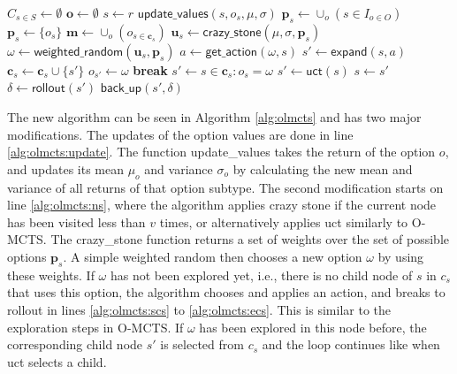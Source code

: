 \begin{algorithm}[h]
	\caption{$\mathsf{OL-MCTS}(O, r, t, d, v, \mu, \sigma)$}
	\label{alg:olmcts}
	\begin{algorithmic}[1]
		\State $C_{s \in S} \gets \emptyset$
		\State $\mathbf{o} \gets \emptyset$
		 \label{alg:olmcts:mainloop}
			\State $s \gets r$
			 \label{alg:olmcts:innerloop}
				 \label{alg:olmcts:sp}
					\State $\mathsf{update\_values}(s, o_s, \mu, \sigma)$
						 \label{alg:olmcts:update}
					\State $\mathbf{p}_s \gets \cup_o (s \in I_{o \in O})$
				\Else
					\State $\mathbf{p}_s \gets \{o_s\}$
				\EndIf \label{alg:olmcts:scs}
				\State $\mathbf{m} \gets \cup_o (o_{s \in \mathbf{c}_s})$
				  
					\label{alg:olmcts:ns}
					\State $\mathbf{u}_s \gets \mathsf{crazy\_stone}(\mu, \sigma, \mathbf{p}_s)$
					\State $\omega \gets \mathsf{weighted\_random}(\mathbf{u}_s, \mathbf{p}_s)$
					 
						\State $a \gets \mathsf{get\_action}(\omega, s)$ \label{alg:olmcts:scs}
						\State $s' \gets \mathsf{expand}(s, a)$ 
						\State $\mathbf{c}_s \gets \mathbf{c}_s \cup \{s'\}$
						\State $o_{s'} \gets \omega$
						\State \textbf{break} \label{alg:olmcts:ecs}
					\Else {}
						\State $s' \gets s \in \mathbf{c}_s : o_s = \omega$ \label{alg:olmcts:s}
					\EndIf
				\Else {}
					\State $s' \gets \mathsf{uct}(s)$ \label{alg:olmcts:uct}
				\EndIf \label{alg:olmcts:ecs}
				\State $s \gets s'$ \label{alg:olmcts:ss}
			\EndWhile
			\State $\delta \gets \mathsf{rollout}(s')$ \label{alg:olmcts:rollout}
			\State $\mathsf{back\_up}(s', \delta)$ \label{alg:olmcts:backup}
		\EndWhile
	\end{algorithmic}
\end{algorithm}

The new algorithm can be seen in Algorithm \ref{alg:olmcts} and has two major
modifications. The updates of the option values are done in line
\ref{alg:olmcts:update}. The function \textsf{update\_values} takes the return
of the option $o$, and updates its mean $\mu_o$ and variance $\sigma_o$ by
calculating the new mean and variance of all returns of that option subtype. The
second modification starts on line \ref{alg:olmcts:ns}, where the algorithm
applies crazy stone if the current node has been visited less than $v$ times, or
alternatively applies \textsf{uct} similarly to O-MCTS. The
\textsf{crazy\_stone} function returns a set of weights over the set of possible
options $\mathbf{p}_s$. A simple weighted random then chooses a new option
$\omega$ by using these weights.  If $\omega$ has not been explored yet, i.e.,
there is no child node of $s$ in $c_s$ that uses this option, the algorithm
chooses and applies an action, and breaks to rollout in lines
\ref{alg:olmcts:scs} to \ref{alg:olmcts:ecs}. This is similar to the exploration
steps in O-MCTS. If $\omega$ has been explored in this node before, the
corresponding child node $s'$ is selected from $c_s$ and the loop continues
like when \textsf{uct} selects a child.

